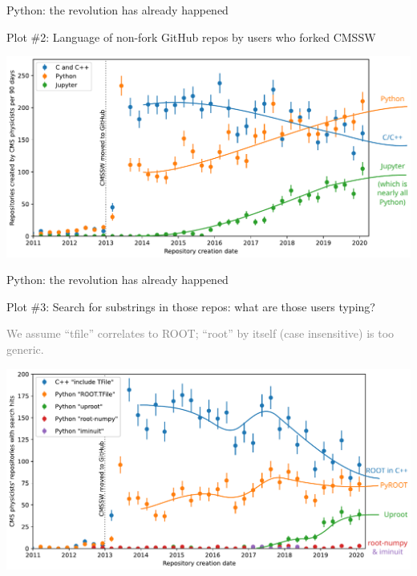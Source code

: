 \documentclass[aspectratio=169]{beamer}
\begin{document}
\begin{frame}{Python: the revolution has already happened}
\large
\vspace{0.5 cm}

Plot \#2: Language of non-fork GitHub repos by users who forked CMSSW

\normalsize
\vspace{\baselineskip}

\begin{center}
\includegraphics[width=0.85\linewidth]{img/01-github-cmssw-language.pdf}
\end{center}
\end{frame}

\begin{frame}{Python: the revolution has already happened}
\large
\vspace{0.5 cm}

Plot \#3: Search for substrings in those repos: what are those users typing?

\normalsize
\textcolor{gray}{We assume ``tfile'' correlates to ROOT; ``root'' by itself (case insensitive) is too generic.}

\begin{center}
\includegraphics[width=0.85\linewidth]{img/03-github-root-python.pdf}
\end{center}
\end{frame}
\end{document}
